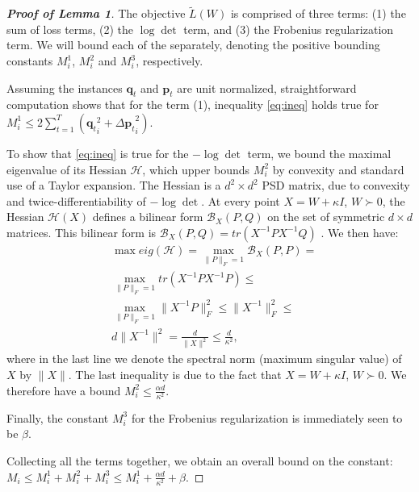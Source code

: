 \documentclass{article} %
\newcommand\mat[1]{{#1}}
\renewcommand\vec[1]{\mathbf{#1}}
\newcommand{\W}{\mat{W}}
\newcommand{\tL}{\tilde{L}(\W)}
\newcommand{\q}{{\vec{q}}}
\newcommand{\p}{{\vec{p}}}
\newcommand{\trip}{{t}}
\newcommand{\qt}{{\q_{\trip}}}
\newcommand{\pt}{{\p_{\trip}}}
\begin{document}
\begin{proof}[\bf{Proof of Lemma 1}]
The objective $\tL$ is comprised of three terms: (1) the sum of loss terms, (2) the $\log \det$ term, and (3) the Frobenius regularization term. We will bound each of the separately, denoting the positive bounding constants $M^1_i$, $M^2_i$ and $M^3_i$, respectively. 

Assuming the instances $\qt$ and $\pt$ are unit normalized, straightforward computation shows that for the term (1), inequality \ref{eq:ineq} holds true for $M^1_i \leq 2 \sum_{t=1}^T (\qt_i^2 +{\Delta\vec{p}_{t}}_i^2)$. %

To show that \ref{eq:ineq} is true for the $- \log \det$ term, we bound the maximal eigenvalue of its Hessian $\mathcal{H}$, which upper bounds $M_i^2$ by convexity and standard use of a Taylor expansion.
The Hessian is a $d^2 \times d^2$ PSD matrix, due to convexity and twice-differentiability of $- \log \det$. At every point $\mat{X} = \W + \kappa I$, $\W \succ 0$, the Hessian $\mathcal{H}(\mat{X})$ defines a bilinear form $\mathcal{B}_{\mat{X}}\left(\mat{P},\mat{Q}\right)$ on the set of symmetric $d \times d$ matrices. This bilinear form is $\mathcal{B}_{\mat{X}}\left(\mat{P},\mat{Q}\right) = tr\left(\mat{X}^{-1}\mat{P} \mat{X}^{-1}\mat{Q}\right)$ \citep[Appendix A]{boyd2004convex}. We then have:
\begin{align*}
&\max eig(\mathcal{H}) = \max_{\|\mat{P}\|_F=1} \mathcal{B}_{\mat{X}}\left(\mat{P},\mat{P}\right) = \\
&\max_{\|\mat{P}\|_F=1} tr\left(\mat{X}^{-1}\mat{P} \mat{X}^{-1}\mat{P}\right) \leq \\
&\max_{\|\mat{P}\|_F=1} \|\mat{X}^{-1} \mat{P}\|_F^2 \leq \|\mat{X}^{-1}\|_F^2 \leq  \\
& d \|\mat{X}^{-1}\|^2 = \frac{d}{\|\mat{X}\|^2} \leq \frac{d}{\kappa^2},
\end{align*}
where in the last line we denote the spectral norm (maximum singular value) of $\mat{X}$ by $\|\mat{X}\|$. The last inequality is due to the fact that $\mat{X} = \W + \kappa I$, $\W \succ 0$.
We therefore have a bound $M^2_i \leq \frac{\alpha d}{\kappa^2}$.

Finally, the constant $M^3_{i}$ for the Frobenius regularization is immediately seen to be $\beta$.

Collecting all the terms together, we obtain an overall bound on the constant: $M_i \leq M^1_{i} + M^2_{i} + M^3_{i} \leq  M^1_{i} + \frac{\alpha d}{\kappa ^2} + \beta$.
\end{proof}
\end{document}
